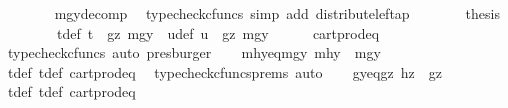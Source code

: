\begin{isabellebody}
\ \ \ \ \ \ \isamarkupfalse%
\ mgy{\isacharunderscore}{\kern0pt}decomp\ \isamarkupfalse%
\ {\isacharparenleft}{\kern0pt}typecheck{\isacharunderscore}{\kern0pt}cfuncs{\isacharcomma}{\kern0pt}\ simp\ add{\isacharcolon}{\kern0pt}\ distribute{\isacharunderscore}{\kern0pt}left{\isacharunderscore}{\kern0pt}ap{\isacharparenright}{\kern0pt}\isanewline
\ \ \ \ \isamarkupfalse%
\ \isamarkupfalse%
\ {\isacharquery}{\kern0pt}thesis\isacommand{{\isachardot}{\kern0pt}}\isamarkupfalse%
\isanewline
\ \ \isamarkupfalse%
\isanewline
\ \ \isamarkupfalse%
\ \isamarkupfalse%
\ t{\isacharunderscore}{\kern0pt}def{}{\isacharcolon}{\kern0pt}\ {\isachardoublequoteopen}t\ {\isacharequal}{\kern0pt}\ {\isasymlangle}gz{\isacharcomma}{\kern0pt}\ mgy{}{\isasymrangle}{\isachardoublequoteclose}\ \ u{\isacharunderscore}{\kern0pt}def{\isacharcolon}{\kern0pt}\ {\isachardoublequoteopen}u\ {\isacharequal}{\kern0pt}\ {\isasymlangle}gz{\isacharcomma}{\kern0pt}\ mgy{}{\isasymrangle}{\isachardoublequoteclose}\isanewline
\ \ \ \ \isamarkupfalse%
\ cart{\isacharunderscore}{\kern0pt}prod{\isacharunderscore}{\kern0pt}eq{}\ \isamarkupfalse%
\ {\isacharparenleft}{\kern0pt}typecheck{\isacharunderscore}{\kern0pt}cfuncs{\isacharcomma}{\kern0pt}\ auto{\isacharcomma}{\kern0pt}\ presburger{\isacharparenright}{\kern0pt}\isanewline
\ \ \isamarkupfalse%
\ mhy{}{\isacharunderscore}{\kern0pt}eq{\isacharunderscore}{\kern0pt}mgy{}{\isacharcolon}{\kern0pt}\ {\isachardoublequoteopen}mhy{}\ {\isacharequal}{\kern0pt}\ mgy{}{\isachardoublequoteclose}\isanewline
\ \ \ \ \isamarkupfalse%
\ t{\isacharunderscore}{\kern0pt}def{}\ t{\isacharunderscore}{\kern0pt}def\ cart{\isacharunderscore}{\kern0pt}prod{\isacharunderscore}{\kern0pt}eq{}\ \isamarkupfalse%
\ {\isacharparenleft}{\kern0pt}typecheck{\isacharunderscore}{\kern0pt}cfuncs{\isacharunderscore}{\kern0pt}prems{\isacharcomma}{\kern0pt}\ auto{\isacharparenright}{\kern0pt}\isanewline
\ \ \isamarkupfalse%
\ gy{\isacharunderscore}{\kern0pt}eq{\isacharunderscore}{\kern0pt}gz{\isacharcolon}{\kern0pt}\ {\isachardoublequoteopen}hz\ {\isacharequal}{\kern0pt}\ gz{\isachardoublequoteclose}\isanewline
\ \ \ \ \isamarkupfalse%
\ t{\isacharunderscore}{\kern0pt}def{}\ t{\isacharunderscore}{\kern0pt}def\ cart{\isacharunderscore}{\kern0pt}prod{\isacharunderscore}{\kern0pt}eq{}\ \isamarkupfalse%

\end{isabellebody}
